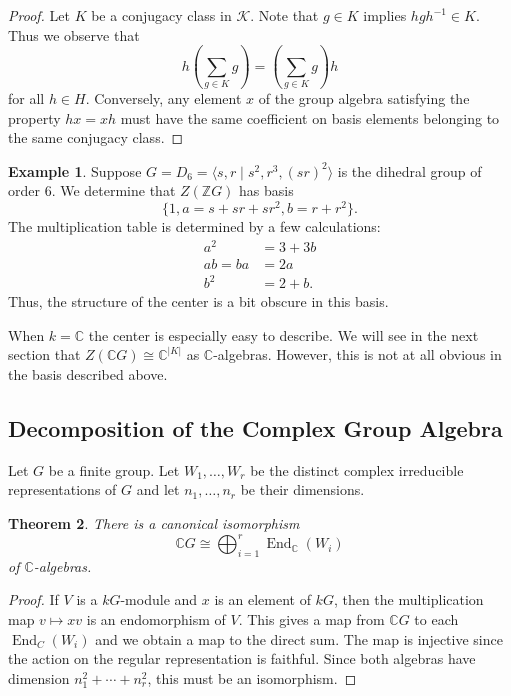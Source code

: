 \documentclass[12pt]{article}
\theoremstyle{plain}
\newtheorem{theorem}{Theorem}[section]
\theoremstyle{definition}
\newtheorem{example}[theorem]{Example}
\theoremstyle{remark}
\numberwithin{equation}{section}
\begin{document}
\begin{proof}
Let $K$ be a conjugacy class in $\mathcal{K}$.
Note that $g \in K$ implies
$hgh^{-1} \in K$.
Thus we observe that
\[
h\left(\sum_{g \in K} g\right)
=\left(\sum_{g \in K} g\right) h
\]
for all $h \in H$. 
Conversely, any element $x$ of the group algebra
satisfying the property $hx=xh$ must have the same coefficient
on basis elements belonging to the same conjugacy class.
\end{proof}

\begin{example}
Suppose $G=D_6=\langle s,r \mid s^2, r^3, (sr)^2 \rangle$
is the dihedral group of order $6$.
We determine that
$Z(\mathbb{Z}G)$ has basis
\[
\{ 1, a = s+sr+sr^2, b = r+r^2 \}.
\]
The multiplication table is determined by a few calculations:
\begin{align*}
a^2 &= 3+3b\\
ab=ba &= 2a\\
b^2 &=2+b.
\end{align*}
Thus, the structure of the center is a bit obscure in this basis.
\end{example}

When $k=\mathbb{C}$ the center is especially easy to describe.
We will see in the next section that $Z(\mathbb{C}G) \cong \mathbb{C}^{|K|}$
as $\mathbb{C}$-algebras.  However, this is not at all obvious in the
basis described above.

\subsection{Decomposition of the Complex Group Algebra}

Let $G$ be a finite group.
Let $W_1,\ldots,W_r$ be the distinct
complex irreducible representations of $G$
and let $n_1,\ldots, n_r$ be their dimensions.

\begin{theorem}
There is a canonical isomorphism
\[
\mathbb{C}G \cong \bigoplus_{i=1}^r \operatorname{End}_{\mathbb{C}}(W_i)
\]
of $\mathbb{C}$-algebras.
\end{theorem}

\begin{proof}
If $V$ is a $kG$-module and $x$ is an element of $kG$,
then the multiplication map $v \mapsto xv$ is an endomorphism
of $V$.
This gives a map from $\mathbb{C}G$ to each
$\operatorname{End}_C(W_i)$ and we obtain
a map to the direct sum.
The map is injective since the action on the regular representation
is faithful.
Since both algebras have dimension $n_1^2+\cdots+n_r^2$,
this must be an isomorphism.
\end{proof}
\end{document}
